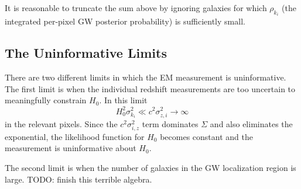 \documentclass[modern]{aastex62}
\begin{document}
It is reasonable to truncate the sum above by ignoring galaxies for which
$\rho_{k_i}$ (the integrated per-pixel \ac{GW} posterior probability) is
sufficiently small.

\subsection{The Uninformative Limits}

There are two different limits in which the \ac{EM} measurement is
uninformative.  The first limit is when the individual redshift measurements are
too uncertain to meaningfully constrain $H_0$.  In this limit
%
\begin{equation}
  H_0^2 \sigma_{k_i}^2 \ll c^2 \sigma_{z,i}^2 \to \infty
\end{equation}
%
in the relevant pixels.  Since the $c^2 \sigma_{i,z}^2$ term dominates $\Sigma$
and also eliminates the exponential, the likelihood function for $H_0$ becomes
constant and the measurement is uninformative about $H_0$.

The second limit is when the number of galaxies in the \ac{GW} localization
region is large.  TODO: finish this terrible algebra.


\end{document}

